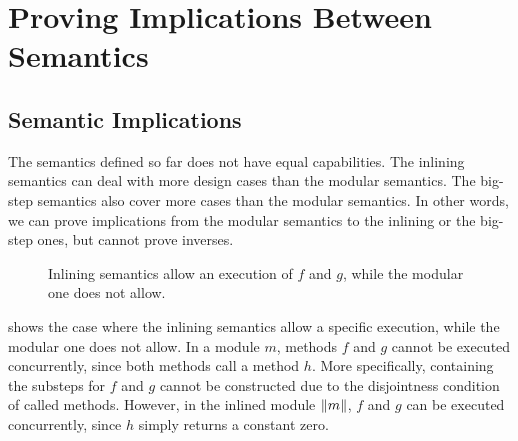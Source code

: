 \chapter{Proving Implications Between Semantics}
\label{chap-implications}

\section{Semantic Implications} %

The semantics defined so far does not have equal capabilities. The
inlining semantics can deal with more design cases than the modular
semantics. The big-step semantics also cover more cases than the
modular semantics. In other words, we can prove implications from the
modular semantics to the inlining or the big-step ones, but cannot
prove inverses.

\begin{figure}[t]
  \begin{subfigure}[b]{0.5\textwidth}
  \end{subfigure}
  \begin{subfigure}[b]{0.5\textwidth}
  \end{subfigure}
  \caption{Inlining semantics allow an execution of $f$ and $g$, while
    the modular one does not allow.}
  \label{ex-inlining-covers-more}
\end{figure}

 shows the case where the inlining
semantics allow a specific execution, while the modular one does not
allow. In a module $m$, methods $f$ and $g$ cannot be executed
concurrently, since both methods call a method $h$. More specifically,
\Substeps{} containing the substeps for $f$ and $g$ cannot be
constructed due to the disjointness condition of called
methods. However, in the inlined module $\| m \|$, $f$ and $g$ can
be executed concurrently, since $h$ simply returns a constant zero.

